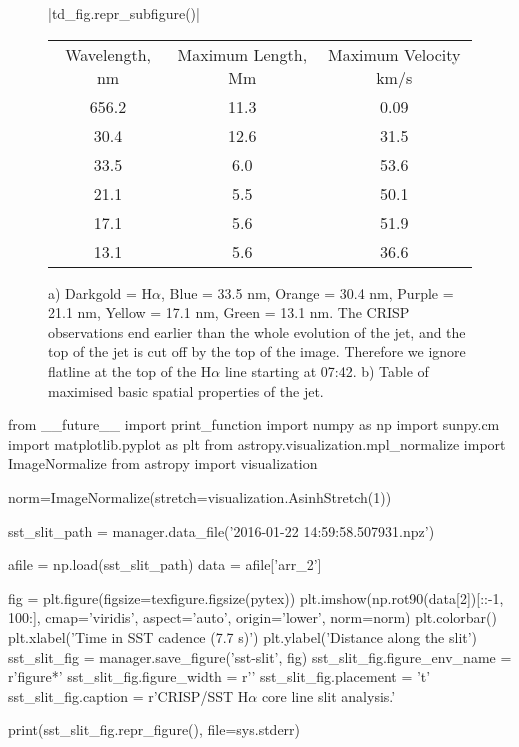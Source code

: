 \documentclass{emulateapj}
\begin{document}
\begin{figure}[t]
	\centering
	\py[T-D-plots]|td_fig.repr_subfigure()|
	
	\begin{subtable}[b]{0.5\textwidth}
		\centering
		\begin{tabular}{ccc}
		Wavelength, nm & Maximum Length, Mm & Maximum Velocity km/s \\
		656.2 & 11.3 & 0.09 \\
		30.4 & 12.6 & 31.5 \\
		33.5 & 6.0 & 53.6 \\
		21.1 & 5.5 & 50.1 \\
		17.1 & 5.6 & 51.9 \\
		13.1 & 5.6 & 36.6 \\
		\end{tabular}
		\caption{}
	\end{subtable}
	\caption{a) Darkgold = H$\alpha$, Blue = 33.5 nm, Orange = 30.4 nm, Purple = 21.1 nm, Yellow = 17.1 nm, Green = 13.1 nm. The CRISP observations end earlier than the whole evolution of the jet, and the top of the jet is cut off by the top of the image. Therefore we ignore flatline at the top of the H$\alpha$ line starting at 07:42. b) Table of maximised basic spatial properties of the jet.}
\end{figure}


\begin{pycode}
from __future__ import print_function
import numpy as np
import sunpy.cm
import matplotlib.pyplot as plt
from astropy.visualization.mpl_normalize import ImageNormalize 
from astropy import visualization

norm=ImageNormalize(stretch=visualization.AsinhStretch(1))

sst_slit_path = manager.data_file('2016-01-22 14:59:58.507931.npz')

afile = np.load(sst_slit_path)
data = afile['arr_2']

fig = plt.figure(figsize=texfigure.figsize(pytex))
plt.imshow(np.rot90(data[2])[::-1, 100:], cmap='viridis', aspect='auto', origin='lower', norm=norm)
plt.colorbar()
plt.xlabel('Time in SST cadence (7.7 s)')
plt.ylabel('Distance along the slit')
sst_slit_fig = manager.save_figure('sst-slit', fig)
sst_slit_fig.figure_env_name = r'figure*'
sst_slit_fig.figure_width = r'\columnwidth'
sst_slit_fig.placement = 't'
sst_slit_fig.caption = r'CRISP/SST H$\alpha$ core line slit analysis.'

print(sst_slit_fig.repr_figure(), file=sys.stderr)
\end{pycode}
\end{document}
